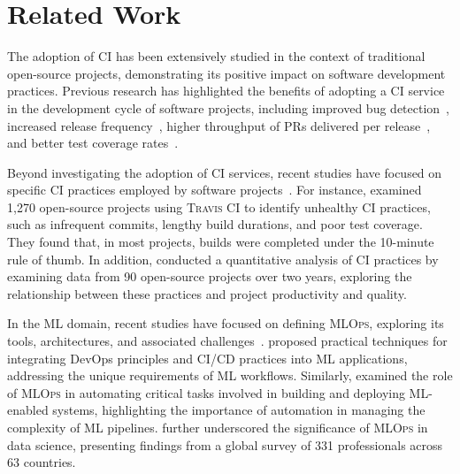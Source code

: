 \section{Related Work}
The adoption of CI has been extensively studied in the context of traditional open-source projects, demonstrating its positive impact on software development practices. 
Previous research has highlighted the benefits of adopting a CI service in the development cycle of software projects, including improved bug detection~\citep{vasilescu2015quality}, increased release frequency~\citep{hilton2016usage}, higher throughput of PRs delivered per release~\citep{bernardo2018studying}, and better test coverage rates~\citep{saraiva2023unveiling}. 

Beyond investigating the adoption of CI services, recent studies have focused on specific CI practices employed by software projects~\citep{felidre2019continuous, santos2022investigating}. For instance, \cite{felidre2019continuous} examined 1,270 open-source projects using \textsc{Travis CI} to identify unhealthy CI practices, such as infrequent commits, lengthy build durations, and poor test coverage. They found that, in most projects, builds were completed under the 10-minute rule of thumb. In addition, \cite{santos2022investigating} conducted a quantitative analysis of CI practices by examining data from 90 open-source projects over two years, exploring the relationship between these practices and project productivity and quality.

In the ML domain, recent studies have focused on defining \textsc{MLOps}, exploring its tools, architectures, and associated challenges~\citep{alla2021mlops, symeonidis2022mlops, kreuzberger2023machine}. \cite{karamitsos2020applying} proposed practical techniques for integrating DevOps principles and CI/CD practices into ML applications, addressing the unique requirements of ML workflows. Similarly, \cite{calefato2022preliminary} examined the role of \textsc{MLOps} in automating critical tasks involved in building and deploying ML-enabled systems, highlighting the importance of automation in managing the complexity of ML pipelines. \cite{makinen2021needs} further underscored the significance of \textsc{MLOps} in data science, presenting findings from a global survey of 331 professionals across 63 countries.

